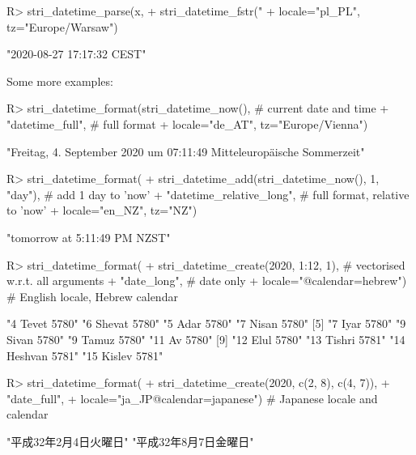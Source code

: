 \documentclass[nojss]{jss}
\begin{document}
\begin{Schunk}
\begin{Sinput}
R> stri_datetime_parse(x,
+      stri_datetime_fstr("%d %B %Y r., godz. %H:%M:%S"),
+      locale="pl_PL", tz="Europe/Warsaw")
\end{Sinput}
\begin{Soutput}
[1] "2020-08-27 17:17:32 CEST"
\end{Soutput}
\end{Schunk}


Some more examples:



\begin{Schunk}
\begin{Sinput}
R> stri_datetime_format(stri_datetime_now(),  # current date and time
+      "datetime_full",                       # full format
+      locale="de_AT", tz="Europe/Vienna")
\end{Sinput}
\begin{Soutput}
[1] "Freitag, 4. September 2020 um 07:11:49 Mitteleuropäische Sommerzeit"
\end{Soutput}
\begin{Sinput}
R> stri_datetime_format(
+      stri_datetime_add(stri_datetime_now(), 1, "day"), # add 1 day to 'now'
+      "datetime_relative_long",              # full format, relative to 'now'
+      locale="en_NZ", tz="NZ")
\end{Sinput}
\begin{Soutput}
[1] "tomorrow at 5:11:49 PM NZST"
\end{Soutput}
\begin{Sinput}
R> stri_datetime_format(
+      stri_datetime_create(2020, 1:12, 1),   # vectorised w.r.t. all arguments
+      "date_long",                           # date only
+      locale="@calendar=hebrew")             # English locale, Hebrew calendar
\end{Sinput}
\begin{Soutput}
 [1] "4 Tevet 5780"    "6 Shevat 5780"   "5 Adar 5780"     "7 Nisan 5780"
 [5] "7 Iyar 5780"     "9 Sivan 5780"    "9 Tamuz 5780"    "11 Av 5780"
 [9] "12 Elul 5780"    "13 Tishri 5781"  "14 Heshvan 5781" "15 Kislev 5781"
\end{Soutput}
\begin{Sinput}
R> stri_datetime_format(
+      stri_datetime_create(2020, c(2, 8), c(4, 7)),
+      "date_full",
+      locale="ja_JP@calendar=japanese")      # Japanese locale and calendar
\end{Sinput}
\begin{Soutput}
[1] "平成32年2月4日火曜日" "平成32年8月7日金曜日"
\end{Soutput}
\end{Schunk}
\end{document}
